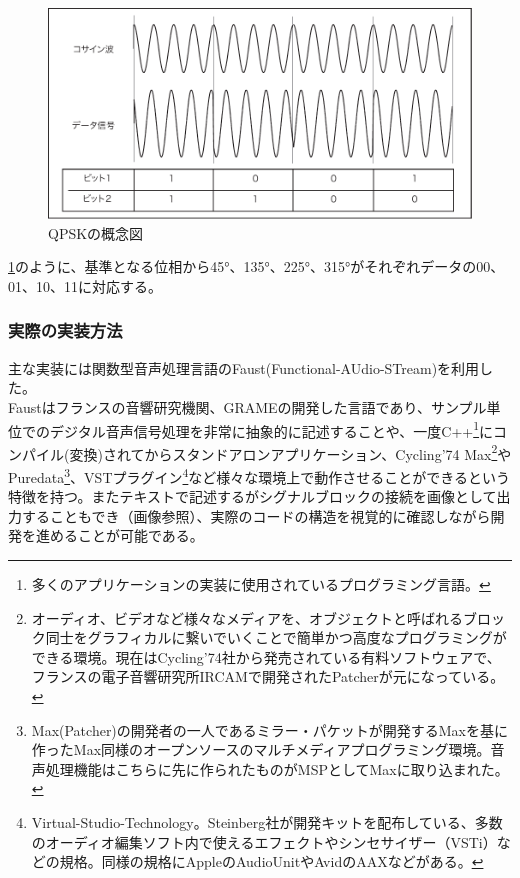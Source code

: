 \documentclass[a4paper,report]{jsbook}
\begin{document}
\begin{figure}[htbp]
\centering
\includegraphics[width=1.00000\textwidth]{./img/qpsk_setsumei.pdf}
\caption{QPSKの概念図\label{fig:qpsk}}
\end{figure}

\cref{fig:qpsk}のように、基準となる位相から45°、135°、225°、315°がそれぞれデータの00、01、10、11に対応する。

\subsubsection{実際の実装方法}\label{ux5b9fux969bux306eux5b9fux88c5ux65b9ux6cd5}

主な実装には関数型音声処理言語のFaust(Functional-AUdio-STream)を利用した。\\
Faustはフランスの音響研究機関、GRAMEの開発した言語であり、サンプル単位でのデジタル音声信号処理を非常に抽象的に記述することや、一度C++\footnote{多くのアプリケーションの実装に使用されているプログラミング言語。}にコンパイル(変換)されてからスタンドアロンアプリケーション、Cycling'74
Max\footnote{オーディオ、ビデオなど様々なメディアを、オブジェクトと呼ばれるブロック同士をグラフィカルに繋いでいくことで簡単かつ高度なプログラミングができる環境。現在はCycling'74社から発売されている有料ソフトウェアで、フランスの電子音響研究所IRCAMで開発されたPatcherが元になっている。}やPuredata\footnote{Max(Patcher)の開発者の一人であるミラー・パケットが開発するMaxを基に作ったMax同様のオープンソースのマルチメディアプログラミング環境。音声処理機能はこちらに先に作られたものがMSPとしてMaxに取り込まれた。}、VSTプラグイン\footnote{Virtual-Studio-Technology。Steinberg社が開発キットを配布している、多数のオーディオ編集ソフト内で使えるエフェクトやシンセサイザー（VSTi）などの規格。同様の規格にAppleのAudioUnitやAvidのAAXなどがある。}など様々な環境上で動作させることができるという特徴を持つ。またテキストで記述するがシグナルブロックの接続を画像として出力することもでき（画像参照）、実際のコードの構造を視覚的に確認しながら開発を進めることが可能である。
\end{document}
